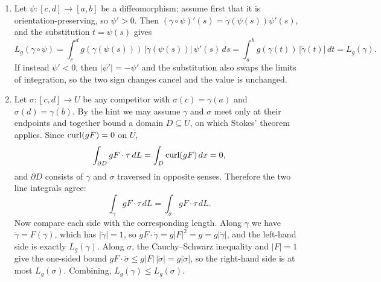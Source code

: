 \begin{exercisesolution}
\label{sol:poincare_geodesics_stokes}
\begin{enumerate}[label=\textbf{(\alph*)}]
  \item Let $\psi : [c,d] \to [a,b]$ be a diffeomorphism; assume first that it is
    orientation-preserving, so $\psi' > 0$. Then $(\gamma \circ \psi)'(s) = \dot\gamma(\psi(s))
    \psi'(s)$, and the substitution $t = \psi(s)$ gives
\[L_g(\gamma \circ \psi) = \int_c^d g(\gamma(\psi(s)))\,\lvert\dot\gamma(\psi(s))\rvert\,\psi'(s) \, ds = \int_a^b g(\gamma(t))\,\lvert\dot\gamma(t)\rvert \, dt = L_g(\gamma).\]
    If instead $\psi' < 0$, then $\lvert\psi'\rvert = -\psi'$ and the substitution also swaps the
    limits of integration, so the two sign changes cancel and the value is unchanged.

  \item Let $\sigma : [c,d] \to U$ be any competitor with $\sigma(c) = \gamma(a)$ and $\sigma(d) =
    \gamma(b)$. By the hint we may assume $\gamma$ and $\sigma$ meet only at their endpoints and
    together bound a domain $D \subseteq U$, on which Stokes' theorem applies. Since $\operatorname{curl}(gF) = 0$
    on $U$,
\[\int_{\partial D} gF \cdot \tau \, dL = \int_D \operatorname{curl}(gF) \, dx = 0,\]
    and $\partial D$ consists of $\gamma$ and $\sigma$ traversed in opposite senses. Therefore the
    two line integrals agree:
\[\int_\gamma gF \cdot \tau \, dL = \int_\sigma gF \cdot \tau \, dL.\]
    Now compare each side with the corresponding length. Along $\gamma$ we have $\dot\gamma = F(\gamma)$,
    which has $\lvert\dot\gamma\rvert = 1$, so $gF \cdot \dot\gamma = g\lvert F\rvert^2 = g =
    g\lvert\dot\gamma\rvert$, and the left-hand side is exactly $L_g(\gamma)$. Along $\sigma$, the
    Cauchy--Schwarz inequality and $\lvert F\rvert = 1$ give the one-sided bound
    $gF \cdot \dot\sigma \le g\lvert F\rvert\,\lvert\dot\sigma\rvert = g\lvert\dot\sigma\rvert$, so the
    right-hand side is at most $L_g(\sigma)$. Combining, $L_g(\gamma) \le L_g(\sigma)$.


\end{enumerate}
\end{exercisesolution}
